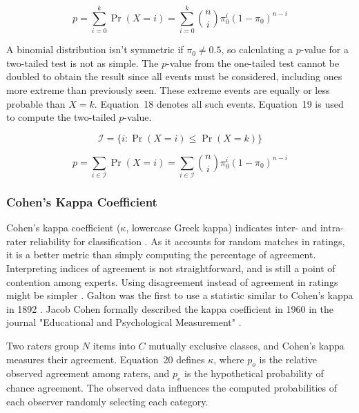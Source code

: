 \documentclass[sn-mathphys-num]{sn-jnl}%
\begin{document}
\begin{equation}
	p=\sum_{i=0}^{k}\Pr(X=i)=\sum_{i=0}^{k}{\binom{n}{i}}\pi_{0}^{i}(1-\pi_{0})^{n-i}
	\label{eqn:17}
\end{equation}

A binomial distribution isn't symmetric if $\pi_{0}\neq 0.5$, so calculating a $p$-value for a two-tailed test is not as simple. The $p$-value from the one-tailed test cannot be doubled to obtain the result since all events must be considered, including ones more extreme than previously seen. These extreme events are equally or less probable than $X=k$. Equation~18 denotes all such events. Equation~19 is used to compute the two-tailed $p$-value.

\begin{equation}
	{\mathcal{I}}=\{i\colon \Pr(X=i)\leq \Pr(X=k)\}
	\label{eqn:18}
\end{equation}

\begin{equation}
	p=\sum_{i\in {\mathcal{I}}}\Pr(X=i)=\sum_{i\in {\mathcal{I}}}{\binom{n}{i}}\pi_{0}^{i}(1-\pi_{0})^{n-i}
	\label{eqn:19}
\end{equation}

\subsubsection{Cohen's Kappa Coefficient}

Cohen's kappa coefficient ($\kappa$, lowercase Greek kappa) indicates inter- and intra-rater reliability for classification \cite{mchugh2012interrater}. As it accounts for random matches in ratings, it is a better metric than simply computing the percentage of agreement. Interpreting indices of agreement is not straightforward, and is still a point of contention among experts. Using disagreement instead of agreement in ratings might be simpler \cite{pontius2011death}. Galton was the first to use a statistic similar to Cohen's kappa in 1892 \cite{galton1892finger, smeeton1985early}. Jacob Cohen formally described the kappa coefficient in 1960 in the journal "Educational and Psychological Measurement" \cite{cohen1960coefficient}.

Two raters group $N$ items into $C$ mutually exclusive classes, and Cohen's kappa measures their agreement. Equation~20 defines $\kappa$, where $p_{o}$ is the relative observed agreement among raters, and $p_{e}$ is the hypothetical probability of chance agreement. The observed data influences the computed probabilities of each observer randomly selecting each category.
\end{document}
